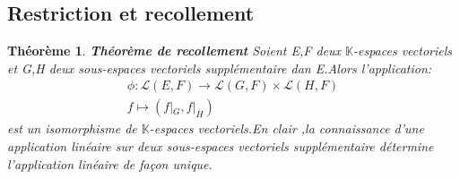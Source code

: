 \documentclass[12pt]{book}
\theoremstyle{definition}\newtheorem{dfn}{Définition}[chapter]
\theoremstyle{plain}\newtheorem{thm}{Théorème}[chapter]
\theoremstyle{plain}\newtheorem{prp}{Proposition}[chapter]
\theoremstyle{plain}\newtheorem{lem}{\bf Lemme}[chapter]
\theoremstyle{plain}\newtheorem{axm}{\bf Axiome}[chapter]
\theoremstyle{plain}\newtheorem{lmm}{\bf Lemme}[chapter]
\theoremstyle{plain}\newtheorem{cor}{\bf Corollaire}[chapter]
\theoremstyle{remark}\newtheorem{rem}{Remarque}[chapter]
\begin{document}
\subsection{Restriction et recollement}
\begin{thm}{\bf Théorème de recollement}  Soient E,F deux $\mathbb{K}$-espaces vectoriels et G,H deux sous-espaces vectoriels supplémentaire dan E.Alors l'application:
\begin{align*}
\phi:\mathcal{L}(E,F)\rightarrow \mathcal{L}(G,F)\times \mathcal{L}(H,F)\\
f\mapsto (f|_{G},f|_{H})
\end{align*}
est un isomorphisme de $\mathbb{K}$-espaces vectoriels.En clair ,la connaissance d'une application linéaire sur deux sous-espaces  vectoriels supplémentaire détermine l'application linéaire de façon unique.
\end{thm}
\end{document}
